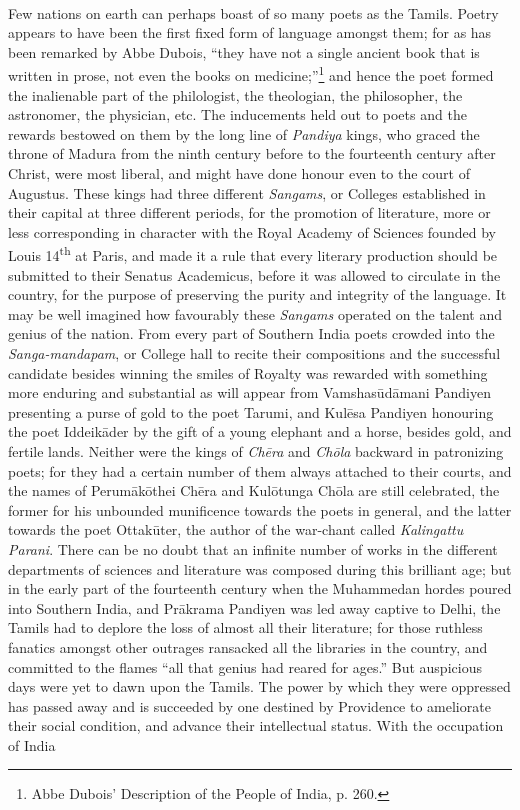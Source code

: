 \documentclass{article}
\begin{document}
\paragraph{}
Few nations on earth can perhaps boast of so many poets as the Tamils. Poetry appears to have been the first fixed form of language amongst them; for as has been remarked by Abbe Dubois, ``they have not a single ancient book that is written in prose, not even the books on medicine;''\footnote{Abbe Dubois' Description of the People of India, p. 260.} and hence the poet formed the inalienable part of the philologist, the theologian, the philosopher, the astronomer, the physician, etc. The inducements held out to poets and the rewards bestowed on them by the long line of \emph{Pandiya} kings, who graced the throne of Madura from the ninth century before to the fourteenth century after Christ, were most liberal, and might have done honour even to the court of Augustus. These kings had three different \emph{Sangams}, or Colleges established in their capital at three different periods, for the promotion of literature, more or less corresponding in character with the Royal Academy of Sciences founded by Louis 14\textsuperscript{th} at Paris, and made it a rule that every literary production should be submitted to their Senatus Academicus, before it was allowed to circulate in the country, for the purpose of preserving the purity and integrity of the language. It may be well imagined how favourably these \emph{Sangams} operated on the talent and genius of the nation. From every part of Southern India poets crowded into the \emph{Sanga-mandapam}, or College hall to recite their compositions and the successful candidate besides winning the smiles of Royalty was rewarded with something more enduring and substantial as will appear from Vamshas\={u}d\={a}mani Pandiyen presenting a purse of gold to the poet Tarumi, and Kul\={e}sa Pandiyen honouring the poet Iddeik\={a}der by the gift of a young elephant and a horse, besides gold, and fertile lands. Neither were the kings of \emph{Ch\={e}ra} and \emph{Ch\={o}la} backward in patronizing poets; for they had a certain number of them always attached to their courts, and the names of Perum\={a}k\={o}thei Ch\={e}ra and Kul\={o}tunga Ch\={o}la are still celebrated, the former for his unbounded munificence towards the poets in general, and the latter towards the poet Ottak\={u}ter, the author of the war-chant called \emph{Kalingattu Parani}. There can be no doubt that an infinite number of works in the different departments of sciences and literature was composed during this brilliant age; but in the early part of the fourteenth century when the Muhammedan hordes poured into Southern India, and Pr\={a}krama Pandiyen was led away captive to Delhi, the Tamils had to deplore the loss of almost all their literature; for those ruthless fanatics amongst other outrages ransacked all the libraries in the country, and committed to the flames ``all that genius had reared for ages.'' But auspicious days were yet to dawn upon the Tamils. The power by which they were oppressed has passed away and is succeeded by one destined by Providence to ameliorate their social condition, and advance their intellectual status. With the occupation of India 
\end{document}
